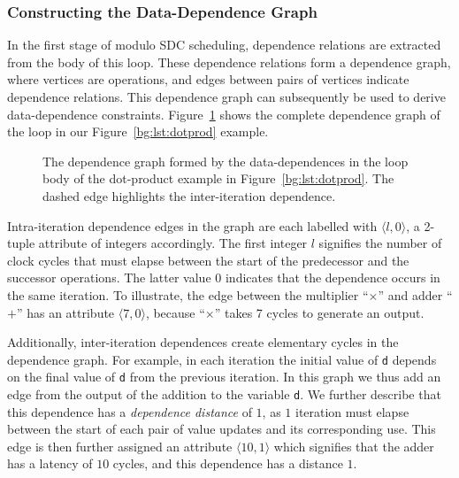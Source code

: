 \subsubsection{Constructing the Data-Dependence Graph}

In the first stage of modulo SDC scheduling, dependence relations are extracted
from the body of this loop.  These dependence relations form a dependence
graph, where vertices are operations, and edges between pairs of vertices
indicate dependence relations.  This dependence graph can subsequently be used
to derive data-dependence constraints.  Figure~\ref{bg:fig:depgraph} shows
the complete dependence graph of the loop in our Figure~\ref{bg:lst:dotprod}
example.
\begin{figure}[ht]
    \centering
    \caption{%
        The dependence graph formed by the data-dependences in the loop body
        of the dot-product example in Figure~\ref{bg:lst:dotprod}.  The dashed
        edge highlights the inter-iteration dependence.
    }\label{bg:fig:depgraph}
\end{figure}

Intra-iteration dependence edges in the graph are each labelled with $\langle
l, 0 \rangle$, a 2-tuple attribute of integers accordingly.  The first integer
$l$ signifies the number of clock cycles that must elapse between the start of
the predecessor and the successor operations.  The latter value $0$ indicates
that the dependence occurs in the same iteration.  To illustrate, the edge
between the multiplier ``$\times$'' and adder ``$+$'' has an attribute $\langle
7, 0 \rangle$, because ``$\times$'' takes 7 cycles to generate an output.

Additionally, inter-iteration dependences create elementary cycles in the
dependence graph.  For example, in each iteration the initial value of \verb|d|
depends on the final value of \verb|d| from the previous iteration.  In this
graph we thus add an edge from the output of the addition to the variable
\verb|d|.  We further describe that this dependence has a \emph{dependence
distance} of $1$, as $1$ iteration must elapse between the start of each pair
of value updates and its corresponding use.  This edge is then further assigned
an attribute $\langle 10, 1 \rangle$ which signifies that the adder has a
latency of $10$ cycles, and this dependence has a distance $1$.

